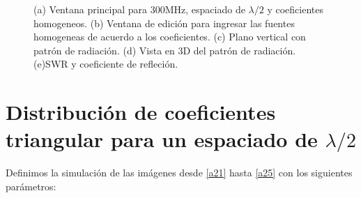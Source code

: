 \documentclass[11pt]{book}
\begin{document}
\begin{figure}[h]
	\caption{(a) Ventana principal para 300MHz, espaciado de $\lambda / 2$ y coeficientes homogeneos. (b) Ventana de edición para ingresar las fuentes homogeneas de acuerdo a los coeficientes. (c) Plano vertical con patrón de radiación. (d) Vista en 3D del patrón de radiación. (e)SWR y coeficiente de refleción.}
\end{figure}


\newpage

\section{Distribución de coeficientes triangular para un espaciado de $\lambda/2$}

Definimos la simulación de las imágenes desde \eqref{a21} hasta \eqref{a25} con los siguientes parámetros:
\end{document}
